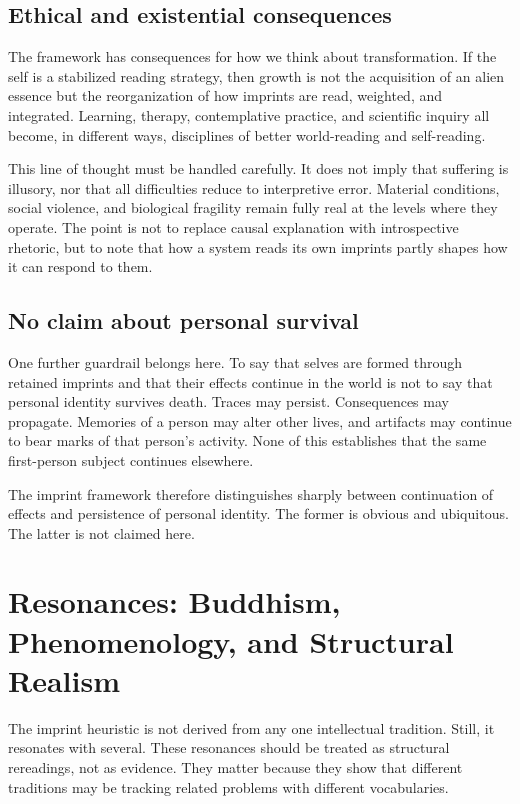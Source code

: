 \documentclass[12pt,a4paper]{article}
\begin{document}
\subsection{Ethical and existential consequences}

The framework has consequences for how we think about transformation. If the self is a stabilized reading strategy, then growth is not the acquisition of an alien essence but the reorganization of how imprints are read, weighted, and integrated. Learning, therapy, contemplative practice, and scientific inquiry all become, in different ways, disciplines of better world-reading and self-reading.

This line of thought must be handled carefully. It does not imply that suffering is illusory, nor that all difficulties reduce to interpretive error. Material conditions, social violence, and biological fragility remain fully real at the levels where they operate. The point is not to replace causal explanation with introspective rhetoric, but to note that how a system reads its own imprints partly shapes how it can respond to them.

\subsection{No claim about personal survival}

One further guardrail belongs here. To say that selves are formed through retained imprints and that their effects continue in the world is not to say that personal identity survives death. Traces may persist. Consequences may propagate. Memories of a person may alter other lives, and artifacts may continue to bear marks of that person's activity. None of this establishes that the same first-person subject continues elsewhere.

The imprint framework therefore distinguishes sharply between continuation of effects and persistence of personal identity. The former is obvious and ubiquitous. The latter is not claimed here.

\section{Resonances: Buddhism, Phenomenology, and Structural Realism}

The imprint heuristic is not derived from any one intellectual tradition. Still, it resonates with several. These resonances should be treated as structural rereadings, not as evidence. They matter because they show that different traditions may be tracking related problems with different vocabularies.
\end{document}

